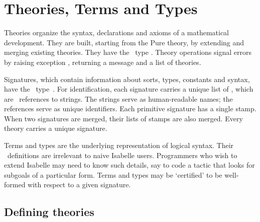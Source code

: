 
\chapter{Theories, Terms and Types} \label{theories}
Theories organize the syntax, declarations and axioms of a mathematical
development.  They are built, starting from the Pure theory, by extending
and merging existing theories.  They have the \ML\ type .
Theory operations signal errors by raising exception ,
returning a message and a list of theories.

Signatures, which contain information about sorts, types, constants and
syntax, have the \ML\ type~.  For identification, each
signature carries a unique list of , which are \ML\
references to strings.  The strings serve as human-readable names; the
references serve as unique identifiers.  Each primitive signature has a
single stamp.  When two signatures are merged, their lists of stamps are
also merged.  Every theory carries a unique signature.

Terms and types are the underlying representation of logical syntax.  Their
\ML\ definitions are irrelevant to naive Isabelle users.  Programmers who
wish to extend Isabelle may need to know such details, say to code a tactic
that looks for subgoals of a particular form.  Terms and types may be
`certified' to be well-formed with respect to a given signature.


\section{Defining theories}\label{sec:ref-defining-theories}

